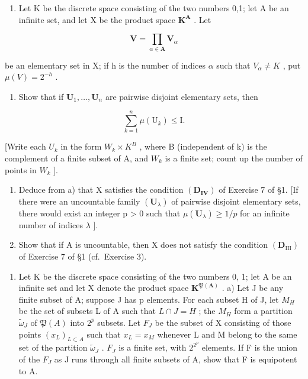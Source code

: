 \begin{enumerate}
\def\labelenumi{\arabic{enumi})}
\setcounter{enumi}{3}
\tightlist
\item
  Let K be the discrete space consisting of the two numbers 0,1; let A be an infinite set, and let X be the product space \(\mathbf{K}^{\mathbf{A}}\) . Let
\end{enumerate}

\[
\mathbf {V} = \prod_ {\alpha \in \mathbf {A}} \mathbf {V} _ {\alpha}
\]

be an elementary set in X; if h is the number of indices \(\alpha\) such that \(V_{\alpha} \neq K\) , put \(\mu(V) = 2^{-h}\) .

\begin{enumerate}
\def\labelenumi{\alph{enumi})}
\tightlist
\item
  Show that if \(\mathbf{U}_1, \ldots, \mathbf{U}_n\) are pairwise disjoint elementary sets, then
\end{enumerate}

\[
\sum_ {k = 1} ^ {n} \mu (\mathrm{U} _ {k}) \leqslant \mathrm{I}.
\]

{[}Write each \(U_{k}\) in the form \(W_{k} \times K^{B}\) , where B (independent of k) is the complement of a finite subset of A, and \(W_{k}\) is a finite set; count up the number of points in \(W_{k}\) {]}.

\begin{enumerate}
\def\labelenumi{\alph{enumi})}
\setcounter{enumi}{1}
\item
  Deduce from a) that X satisfies the condition \((\mathbf{D}_{\mathbf{IV}})\) of Exercise 7 of §1. {[}If there were an uncountable family \((\mathbf{U}_{\lambda})\) of pairwise disjoint elementary sets, there would exist an integer p \textgreater{} 0 such that \(\mu(\mathbf{U}_{\lambda}) \geqslant 1/p\) for an infinite number of indices \(\lambda\) {]}.
\item
  Show that if A is uncountable, then X does not satisfy the condition \((\mathbf{D}_{\mathrm{III}})\) of Exercise 7 of §1 (cf.~Exercise 3).
\end{enumerate}

\begin{enumerate}
\def\labelenumi{\arabic{enumi})}
\setcounter{enumi}{4}
\tightlist
\item
  Let K be the discrete space consisting of the two numbers 0, 1; let A be an infinite set and let X denote the product space \(\mathbf{K}^{\mathfrak{P}(\mathbf{A})}\) . a) Let J be any finite subset of A; suppose J has p elements. For each subset H of J, let \(M_{H}\) be the set of subsets L of A such that \(L \cap J = H\) ; the \(M_{H}\) form a partition \(\tilde{\omega}_{J}\) of \(\mathfrak{P}(A)\) into \(2^{p}\) subsets. Let \(F_{J}\) be the subset of X consisting of those points \((x_{L})_{L \subset A}\) such that \(x_{L} = x_{M}\) whenever L and M belong to the same set of the partition \(\tilde{\omega}_{J}\) . \(F_{J}\) is a finite set, with \(2^{2^{p}}\) elements. If F is the union of the \(F_{J}\) as J runs through all finite subsets of A, show that F is equipotent to A.
\end{enumerate}

